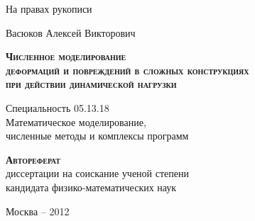 \begin{titlepage}
\newpage

\begin{center}

\end{center}


\begin{flushright}
На правах рукописи
\end{flushright}

\vspace{6em}

\begin{center}
Васюков Алексей Викторович
\end{center}

\vspace{4em}

\begin{center}
\textsc{\textbf{Численное моделирование\\
деформаций и повреждений в сложных конструкциях\\
при действии динамической нагрузки}}
\end{center}

\vspace{4em}

\begin{center}
Специальность 05.13.18\\
Математическое моделирование,\\
численные методы и комплексы программ
\end{center}

\vspace{1.5em}

\begin{center}
\textsc{\textbf{Автореферат}}\\
диссертации на соискание ученой степени\\
кандидата физико-математических наук
\end{center}

%

\vspace{\fill}
\begin{center}
Москва -- 2012
\end{center}

\end{titlepage}
